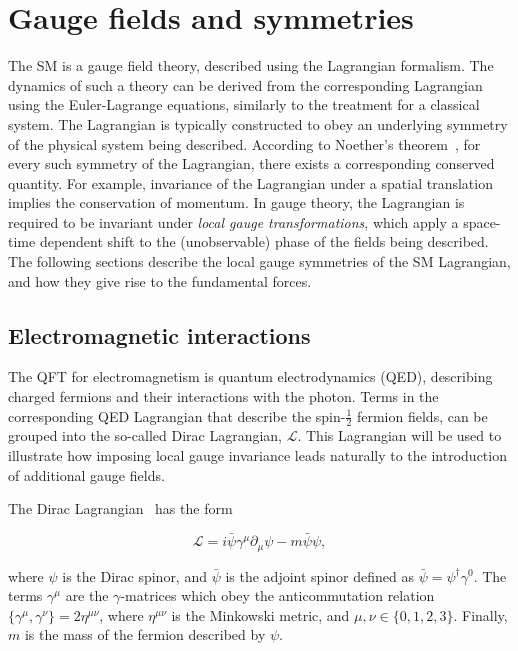 \section{Gauge fields and symmetries}

The SM is a gauge field theory, described using the Lagrangian formalism. The dynamics of such a theory can be derived from the corresponding Lagrangian using the Euler-Lagrange equations, similarly to the treatment for a classical system. The Lagrangian is typically constructed to obey an underlying symmetry of the physical system being described. According to Noether's theorem~\cite{Nother}, for every such symmetry of the Lagrangian, there exists a corresponding conserved quantity. For example, invariance of the Lagrangian under a spatial translation implies the conservation of momentum. In gauge theory, the Lagrangian is required to be invariant under \textit{local gauge transformations}, which apply a space-time dependent shift to the (unobservable) phase of the fields being described. The following sections describe the local gauge symmetries of the SM Lagrangian, and how they give rise to the fundamental forces.

\subsection{Electromagnetic interactions}

The QFT for electromagnetism is quantum electrodynamics (QED), describing charged fermions and their interactions with the photon. Terms in the corresponding QED Lagrangian that describe the spin-${\frac{1}{2}}$ fermion fields, can be grouped into the so-called Dirac Lagrangian, ${\mathcal{L}}$. This Lagrangian will be used to illustrate how imposing local gauge invariance leads naturally to the introduction of additional gauge fields. 

The Dirac Lagrangian~\cite{Thomson} has the form

\begin{equation}
    \mathcal{L} = i\bar{\psi}\gamma^{\mu}\partial_{\mu}\psi - m\bar{\psi}\psi,
\end{equation}

\noindent where ${\psi}$ is the Dirac spinor, and ${\bar{\psi}}$ is the adjoint spinor defined as ${\bar{\psi}=\psi^{\dagger}\gamma^{0}}$. The terms ${\gamma^{\mu}}$ are the ${\gamma}$-matrices which obey the anticommutation relation ${\{\gamma^{\mu},\gamma^{\nu}\} = 2\eta^{\mu\nu}}$, where ${\eta^{\mu\nu}}$ is the Minkowski metric, and ${\mu,\nu \in \{0,1,2,3\}}$. Finally, ${m}$ is the mass of the fermion described by ${\psi}$.

